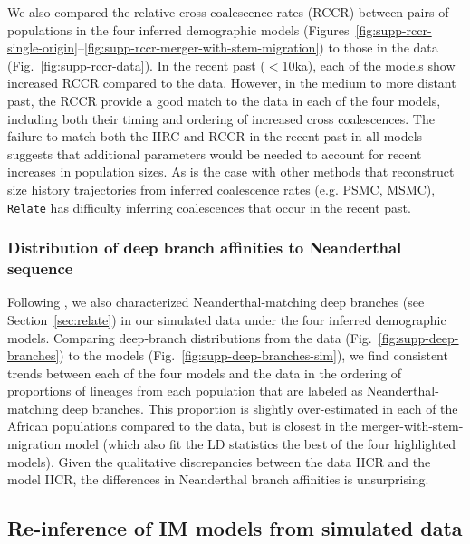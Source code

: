 \documentclass[]{article}
\newcommand{\Relate}{\texttt{Relate}\xspace}
\begin{document}
We also compared the relative cross-coalescence rates (RCCR) between pairs of
populations in the four inferred demographic models
(Figures~\ref{fig:supp-rccr-single-origin}--\ref{fig:supp-rccr-merger-with-stem-migration})
to those in the data (Fig.~\ref{fig:supp-rccr-data}). In the recent past
($<$10ka), each of the models show increased RCCR compared to the data.
However, in the medium to more distant past, the RCCR provide a good match to
the data in each of the four models, including both their timing and ordering
of increased cross coalescences. The failure to match both the IIRC and RCCR in
the recent past in all models suggests that additional parameters would be
needed to account for recent increases in population sizes. As is the case with
other methods that reconstruct size history trajectories from inferred coalescence
rates (e.g. PSMC, MSMC), \Relate has difficulty inferring coalescences that
occur in the recent past.

\subsubsection{Distribution of deep branch affinities to Neanderthal sequence}

Following \citet{Speidel2019-nj}, we also characterized Neanderthal-matching
deep branches (see Section~\ref{sec:relate}) in our simulated data under the
four inferred demographic models. Comparing deep-branch distributions from the
data (Fig.~\ref{fig:supp-deep-branches}) to the models
(Fig.~\ref{fig:supp-deep-branches-sim}), we find consistent trends between each
of the four models and the data in the ordering of proportions of lineages from
each population that are labeled as Neanderthal-matching deep branches. This
proportion is slightly over-estimated in each of the African populations
compared to the data, but is closest in the merger-with-stem-migration model
(which also fit the LD statistics the best of the four highlighted models).
Given the qualitative discrepancies between the data IICR and the model IICR,
the differences in Neanderthal branch affinities is unsurprising.


\subsection{Re-inference of IM models from simulated data}
\label{sec:IM-reinfer}
\end{document}

